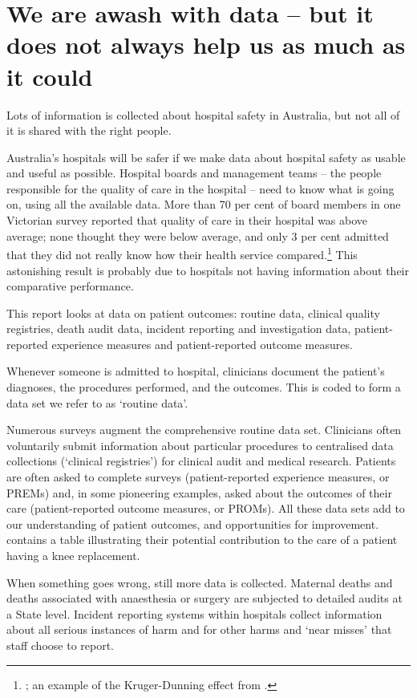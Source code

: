 \documentclass[FrontPage]{grattan}
\begin{document}
\contentspage

\chapter{We are awash with data -- but it does not always help us as much as it could}\label{chap:awash}
Lots of information is collected about hospital safety in Australia, but not all of it is shared with the right people. 

Australia’s hospitals will be safer if we make data about hospital safety as usable and useful as possible. Hospital boards and management teams – the people responsible for the quality of care in the hospital – need to know what is going on, using all the available data. More than 70 per cent of board members in one Victorian survey reported that quality of care in their hospital was above average; none thought they were below average, and only 3 per cent admitted that they did not really know how their health service compared.\footnote{\textcites[][685--686]{RN7}{RN6}; an example of the Kruger-Dunning effect from \textcite{RN8}.} This astonishing result is probably due to hospitals not having information about their comparative performance.

This report looks at data on patient outcomes: routine data, clinical quality registries, death audit data, incident reporting and investigation data, patient-reported experience measures and patient-reported outcome measures. 

Whenever someone is admitted to hospital, clinicians document the patient’s diagnoses, the procedures performed, and the outcomes. This is coded to form a data set we refer to as `routine data'. 

Numerous surveys augment the comprehensive routine data set. Clinicians often voluntarily submit information about particular procedures to centralised data collections (`clinical registries') for clinical audit and medical research. Patients are often asked to complete surveys (patient-reported experience measures, or PREMs) and, in some pioneering examples, asked about the outcomes of their care (patient-reported outcome measures, or PROMs). All these data sets add to our understanding of patient outcomes, and opportunities for improvement.  contains a table illustrating their potential contribution to the care of a patient having a knee replacement.

When something goes wrong, still more data is collected. Maternal deaths and deaths associated with anaesthesia or surgery are subjected to detailed audits at a State level. Incident reporting systems within hospitals collect information about all serious instances of harm and for other harms and `near misses' that staff choose to report.
\end{document}
